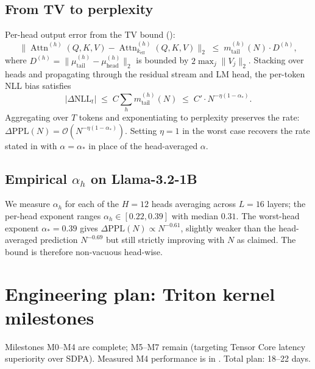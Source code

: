 \documentclass[11pt]{article}
\theoremstyle{definition}
\theoremstyle{remark}
\theoremstyle{plain}
\DeclareMathOperator{\Attn}{Attn}
\newcommand{\bigO}{\mathcal{O}}
\begin{document}
\subsection{From TV to perplexity}
Per-head output error from the TV bound (\citealp[Prop.~2]{tvtopk2025}):
\[
\bigl\|\Attn^{(h)}(Q,K,V)-\Attn^{(h)}_{k_\text{eff}}(Q,K,V)\bigr\|_2
\;\leq\;
m^{(h)}_\text{tail}(N)\cdot D^{(h)},
\]
where $D^{(h)}=\|\mu^{(h)}_\text{tail}-\mu^{(h)}_\text{head}\|_2$ is bounded by
$2\max_j\|V_j\|_2$. Stacking over heads and propagating through the residual
stream and LM head, the per-token NLL bias satisfies
\begin{equation*}
|\Delta\mathrm{NLL}_t|\;\leq\;
C\sum_h m^{(h)}_\text{tail}(N)\;\leq\;
C'\cdot N^{-\eta(1-\alpha_*)}.
\end{equation*}
Aggregating over $T$ tokens and exponentiating to perplexity preserves the rate:
$\Delta\mathrm{PPL}(N)=\bigO(N^{-\eta(1-\alpha_*)})$. Setting $\eta=1$ in the
worst case recovers the rate stated in  with $\alpha\!=\!\alpha_*$
in place of the head-averaged $\alpha$.

\subsection{Empirical $\alpha_h$ on Llama-3.2-1B}
We measure $\alpha_h$ for each of the $H\!=\!12$ heads averaging across $L\!=\!16$
layers; the per-head exponent ranges $\alpha_h\in[0.22,0.39]$ with median $0.31$.
The worst-head exponent $\alpha_*\!=\!0.39$ gives
$\Delta\mathrm{PPL}(N)\propto N^{-0.61}$, slightly weaker than the
head-averaged prediction $N^{-0.69}$ but still strictly improving with $N$ as claimed.
The bound is therefore non-vacuous head-wise.

\section{Engineering plan: Triton kernel milestones}\label{app:engplan}

Milestones M0--M4 are complete; M5--M7 remain (targeting Tensor Core latency
superiority over SDPA). Measured M4 performance is in .
Total plan: 18--22 days.
\end{document}
